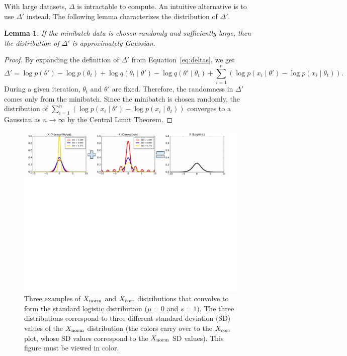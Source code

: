 \documentclass{article}
\newtheorem{lemma}{Lemma}
\begin{document}
With large datasets, $\Delta$ is intractable to compute. An intuitive alternative is to use
$\Delta'$ instead. The following lemma characterizes the distribution of $\Delta'$.

\begin{lemma}\label{lem:gaussian}
If the minibatch data is chosen randomly and sufficiently large, then the distribution of $\Delta'$ is approximately Gaussian.
\end{lemma}

\begin{proof}
By expanding the definition of $\Delta'$ from Equation~\ref{eq:deltas}, we get
\[
\Delta' = \log p(\theta') - \log p(\theta_t) + \log q(\theta_t \mid \theta') - \log q(\theta' \mid \theta_t) +
\sum_{i=1}^n (\log p(x_i\mid \theta') - \log p(x_i\mid \theta_t)).
\]
During a given iteration, $\theta_t$ and $\theta'$ are fixed. Therefore, the randomness in $\Delta'$
comes only from the minibatch. Since the minibatch is chosen randomly, the distribution of
$\sum_{i=1}^n (\log p(x_i\mid \theta') - \log p(x_i\mid \theta_t))$ converges to a Gaussian as $n
\to \infty$ by the Central Limit Theorem.
\end{proof}

\begin{figure}[t]
    \centering
    \includegraphics[width=\textwidth]{mh_convolution_diagram}
    \caption{
    Three examples of $X_{\rm norm}$ and $X_{\rm corr}$ distributions that convolve to form the
    standard logistic distribution ($\mu=0$ and $s=1$). The three distributions correspond to three
    different standard deviation (SD) values of the $X_{\rm norm}$ distribution (the colors carry
    over to the $X_{\rm corr}$ plot, whose SD values correspond to the $X_{\rm norm}$ SD values).
    This figure must be viewed in color.
    }
    \label{fig:deconvolution}
    \vspace{-10pt}
\end{figure}
\end{document}
